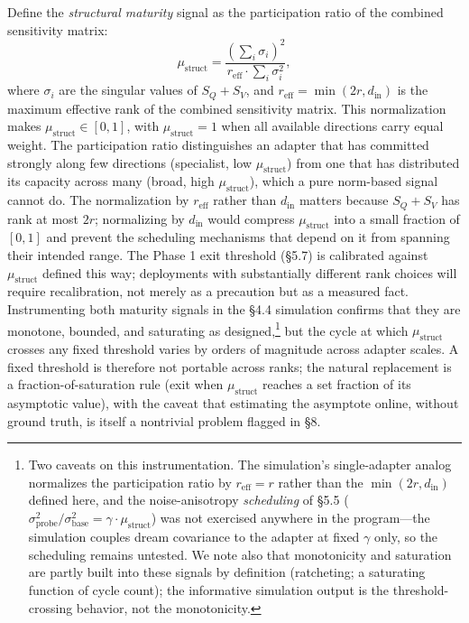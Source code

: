 \documentclass[11pt]{article}
\begin{document}
Define the \emph{structural maturity} signal as the participation ratio of the combined sensitivity matrix:
\begin{equation}
    \mu_\text{struct} = \frac{\left(\sum_i \sigma_i\right)^2}{r_\text{eff} \cdot \sum_i \sigma_i^2},
\end{equation}
where $\sigma_i$ are the singular values of $S_Q + S_V$, and $r_\text{eff} = \min(2r, d_\text{in})$ is the maximum effective rank of the combined sensitivity matrix. This normalization makes $\mu_\text{struct} \in [0, 1]$, with $\mu_\text{struct} = 1$ when all available directions carry equal weight. The participation ratio distinguishes an adapter that has committed strongly along few directions (specialist, low $\mu_\text{struct}$) from one that has distributed its capacity across many (broad, high $\mu_\text{struct}$), which a pure norm-based signal cannot do. The normalization by $r_\text{eff}$ rather than $d_\text{in}$ matters because $S_Q + S_V$ has rank at most $2r$; normalizing by $d_\text{in}$ would compress $\mu_\text{struct}$ into a small fraction of $[0,1]$ and prevent the scheduling mechanisms that depend on it from spanning their intended range. The Phase 1 exit threshold (\S 5.7) is calibrated against $\mu_\text{struct}$ defined this way; deployments with substantially different rank choices will require recalibration, not merely as a precaution but as a measured fact. Instrumenting both maturity signals in the \S 4.4 simulation confirms that they are monotone, bounded, and saturating as designed,\footnote{Two caveats on this instrumentation. The simulation's single-adapter analog normalizes the participation ratio by $r_\text{eff} = r$ rather than the $\min(2r, d_\text{in})$ defined here, and the noise-anisotropy \emph{scheduling} of \S 5.5 ($\sigma_\text{probe}^2/\sigma_\text{base}^2 = \gamma \cdot \mu_\text{struct}$) was not exercised anywhere in the program---the simulation couples dream covariance to the adapter at fixed $\gamma$ only, so the scheduling remains untested. We note also that monotonicity and saturation are partly built into these signals by definition (ratcheting; a saturating function of cycle count); the informative simulation output is the threshold-crossing behavior, not the monotonicity.} but the cycle at which $\mu_\text{struct}$ crosses any fixed threshold varies by orders of magnitude across adapter scales. A fixed threshold is therefore not portable across ranks; the natural replacement is a fraction-of-saturation rule (exit when $\mu_\text{struct}$ reaches a set fraction of its asymptotic value), with the caveat that estimating the asymptote online, without ground truth, is itself a nontrivial problem flagged in \S 8.
\end{document}
